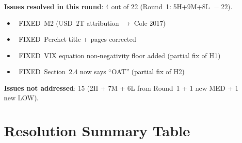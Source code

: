 \documentclass[12pt,a4paper]{article}
\newcommand{\FIXED}{\textcolor{okgreen}{\checkmark\ FIXED}}
\begin{document}
\medskip

\noindent\textbf{Issues resolved in this round}: 4 out of 22 (Round~1: 5H+9M+8L $= 22$).
\begin{itemize}
  \item \FIXED\ M2 (USD~2T attribution $\to$ Cole 2017)
  \item \FIXED\ Perchet title + pages corrected
  \item \FIXED\ VIX equation non-negativity floor added (partial fix of H1)
  \item \FIXED\ Section~2.4 now says ``OAT'' (partial fix of H2)
\end{itemize}

\noindent\textbf{Issues not addressed}: 15 (2H + 7M + 6L from Round~1 + 1 new MED + 1 new LOW).


\section*{Resolution Summary Table}
\end{document}
